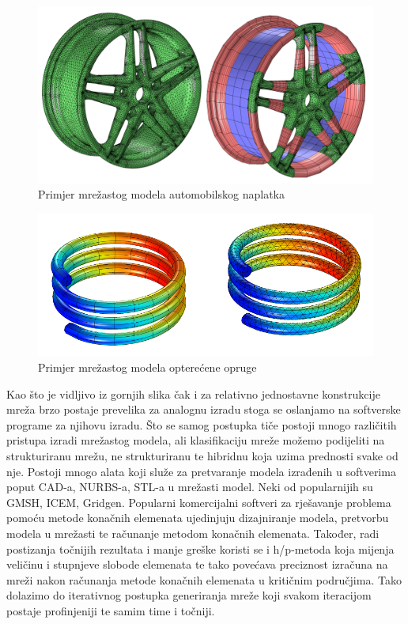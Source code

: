 \documentclass[a4paper,twoside,12pt]{memoir} %
\begin{document}
\begin{figure}[h!t]
\begin{center}
\includegraphics[scale=0.2]{pictures/chapter_fem/Wheel-rim-mesh-example-large.png}
\caption{Primjer mrežastog modela automobilskog naplatka \cite{comslo_mesh}}
\label{fig:mesh_rim}
\end{center}
\end{figure}

\begin{figure}[h!t]
\begin{center}
\includegraphics[scale=0.6]{pictures/chapter_fem/Loaded-spring-example.png}
\caption{Primjer mrežastog modela opterećene opruge \cite{comslo_mesh}}
\label{fig:mesh_spring}
\end{center}
\end{figure}

\par
Kao što je vidljivo iz gornjih slika čak i za relativno jednostavne konstrukcije mreža brzo postaje prevelika za analognu izradu stoga se oslanjamo na softverske programe za njihovu izradu. Što se samog postupka tiče postoji mnogo različitih pristupa izradi mrežastog modela, ali klasifikaciju mreže možemo podijeliti na strukturiranu mrežu, ne strukturiranu te hibridnu koja uzima prednosti svake od nje. Postoji mnogo alata koji služe za pretvaranje modela izrađenih u softverima poput CAD-a, NURBS-a, STL-a u mrežasti model. Neki od popularnijih su GMSH, ICEM, Gridgen. Popularni komercijalni softveri za rješavanje problema pomoću metode konačnih elemenata ujedinjuju dizajniranje modela, pretvorbu modela u mrežasti te računanje metodom konačnih elemenata. Također, radi postizanja točnijih rezultata i manje greške koristi se i h/p-metoda koja mijenja veličinu i stupnjeve slobode elemenata te tako povećava preciznost izračuna na mreži nakon računanja metode konačnih elemenata u kritičnim područjima. Tako dolazimo do iterativnog postupka generiranja mreže koji svakom iteracijom postaje profinjeniji te samim time i točniji. \par 
\end{document}
